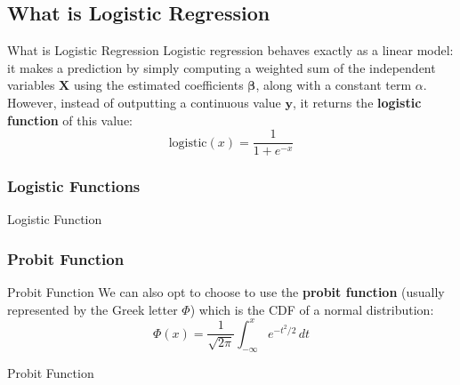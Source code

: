 \subsection{What is Logistic Regression}
\begin{frame}{What is Logistic Regression}
	Logistic regression behaves exactly as a linear model:
	it makes a prediction by simply computing a weighted sum of the
	independent variables $\mathbf{X}$ using the estimated coefficients $\boldsymbol{\beta}$,
	along with a constant term $\alpha$.
	However, instead of outputting a continuous value $\mathbf{y}$,
	it returns the \textbf{logistic function} of this value:
	$$
		\text{logistic}(x) = \frac{1}{1 + e^{-x}}
	$$
\end{frame}


\subsubsection{Logistic Functions}

\begin{frame}{Logistic Function}
\end{frame}

\subsubsection{Probit Function}
\begin{frame}{Probit Function}
	We can also opt to choose to use the \textbf{probit function}
	(usually represented by the Greek letter $\Phi$)
	which is the CDF of a normal distribution:
	$$
		\Phi (x)= \frac {1}{\sqrt {2 \pi}}\int _{-\infty }^{x}e^{-t^{2}/2}\,dt
	$$
\end{frame}

\begin{frame}{Probit Function}
\end{frame}


